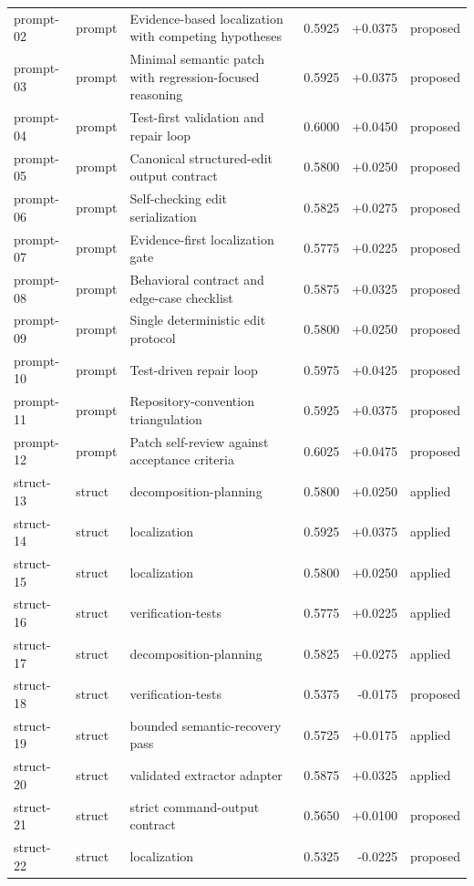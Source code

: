 \begin{center}
\begin{longtable}{llp{5.2cm}rrl}
prompt-02 & prompt & Evidence-based localization with competing hypotheses & 0.5925 & +0.0375 & proposed \\
prompt-03 & prompt & Minimal semantic patch with regression-focused reasoning & 0.5925 & +0.0375 & proposed \\
prompt-04 & prompt & Test-first validation and repair loop & 0.6000 & +0.0450 & proposed \\
prompt-05 & prompt & Canonical structured-edit output contract & 0.5800 & +0.0250 & proposed \\
prompt-06 & prompt & Self-checking edit serialization & 0.5825 & +0.0275 & proposed \\
prompt-07 & prompt & Evidence-first localization gate & 0.5775 & +0.0225 & proposed \\
prompt-08 & prompt & Behavioral contract and edge-case checklist & 0.5875 & +0.0325 & proposed \\
prompt-09 & prompt & Single deterministic edit protocol & 0.5800 & +0.0250 & proposed \\
prompt-10 & prompt & Test-driven repair loop & 0.5975 & +0.0425 & proposed \\
prompt-11 & prompt & Repository-convention triangulation & 0.5925 & +0.0375 & proposed \\
prompt-12 & prompt & Patch self-review against acceptance criteria & 0.6025 & +0.0475 & proposed \\
struct-13 & struct & decomposition-planning & 0.5800 & +0.0250 & applied \\
struct-14 & struct & localization & 0.5925 & +0.0375 & applied \\
struct-15 & struct & localization & 0.5800 & +0.0250 & applied \\
struct-16 & struct & verification-tests & 0.5775 & +0.0225 & applied \\
struct-17 & struct & decomposition-planning & 0.5825 & +0.0275 & applied \\
struct-18 & struct & verification-tests & 0.5375 & -0.0175 & proposed \\
struct-19 & struct & bounded semantic-recovery pass & 0.5725 & +0.0175 & applied \\
struct-20 & struct & validated extractor adapter & 0.5875 & +0.0325 & applied \\
struct-21 & struct & strict command-output contract & 0.5650 & +0.0100 & proposed \\
struct-22 & struct & localization & 0.5325 & -0.0225 & proposed \\

\end{longtable}
\end{center}
